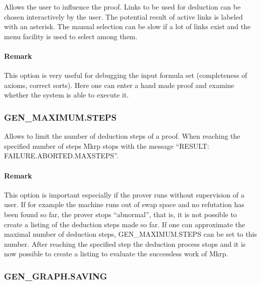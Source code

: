 Allows the user to influence the proof. Links to be used for deduction can 
be chosen interactively by the user. The potential result of active
links is labeled with an asterisk. The manual selection can be slow if
a lot of links exist and the menu facility is used to select among them.

\pagebreak
\PO
{}

\paragraph{Remark}
This option is very useful for debugging the input formula set
(completeness of axioms, correct sorts). Here one can enter a hand
made proof and examine whether the system is able to execute it.


\subsubsection{GEN\_MAXIMUM.STEPS}
  

Allows to limit the number of deduction steps of a proof. When reaching 
the specified number of steps {\sc Mkrp} stops with the message 
``RESULT: FAILURE.ABORTED.MAXSTEPS''.

\PO
{}

\paragraph{Remark}
This option is important especially if the prover runs without
supervision of a user. If for example the machine runs out of swap space
and no refutation has been 
found so far, the prover stops ``abnormal'', that is, it is not possible to create a 
listing of the deduction steps made so far. If one can approximate the 
maximal number of deduction steps, GEN\_MAXIMUM.STEPS can be set to this 
number. After  reaching the specified step the deduction process stops  
and it is now possible to create a listing to evaluate the successless work
of {\sc Mkrp}. 

\subsubsection{GEN\_GRAPH.SAVING}
  

